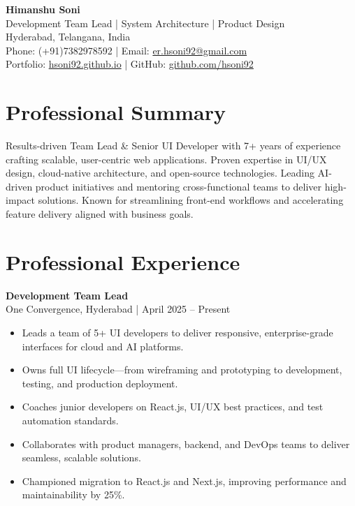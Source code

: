 \documentclass[11pt, a4paper]{article}
\newcommand{\smallgray}[1]{\textcolor{darkgray!90}{\small #1}}
\begin{document}
\begin{center}
    {\LARGE\bfseries Himanshu Soni} \\
    \vspace{2pt}
    {\normalsize Development Team Lead | System Architecture | Product Design} \\
    \vspace{2pt}
    Hyderabad, Telangana, India \\
    Phone: (+91)7382978592 | Email: \href{mailto:er.hsoni92@gmail.com}{er.hsoni92@gmail.com} \\
    Portfolio: \href{https://hsoni92.github.io}{hsoni92.github.io} | GitHub: \href{https://github.com/hsoni92}{github.com/hsoni92}
\end{center}

\hrulefill
\vspace{5pt}

\section{Professional Summary}
Results-driven Team Lead \& Senior UI Developer with 7+ years of experience crafting scalable, user-centric web applications. Proven expertise in UI/UX design, cloud-native architecture, and open-source technologies. Leading AI-driven product initiatives and mentoring cross-functional teams to deliver high-impact solutions. Known for streamlining front-end workflows and accelerating feature delivery aligned with business goals.


\section{Professional Experience}
\textbf{Development Team Lead} \\
\smallgray{One Convergence, Hyderabad | April 2025 -- Present}
\begin{itemize}
    \item Leads a team of 5+ UI developers to deliver responsive, enterprise-grade interfaces for cloud and AI platforms.
    \item Owns full UI lifecycle—from wireframing and prototyping to development, testing, and production deployment.
    \item Coaches junior developers on React.js, UI/UX best practices, and test automation standards.
    \item Collaborates with product managers, backend, and DevOps teams to deliver seamless, scalable solutions.
    \item Championed migration to React.js and Next.js, improving performance and maintainability by 25\%.
\end{itemize}
\end{document}
